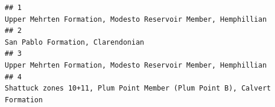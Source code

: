 \documentclass[]{article}
\begin{document}
\begin{verbatim}
## 1                                                                                                                                                                                                                                                                                                                                                                                                                                                                                                                                                                                                                                    Upper Mehrten Formation, Modesto Reservoir Member, Hemphillian
## 2                                                                                                                                                                                                                                                                                                                                                                                                                                                                                                                                                                                                                                                                 San Pablo Formation, Clarendonian
## 3                                                                                                                                                                                                                                                                                                                                                                                                                                                                                                                                                                                                                                    Upper Mehrten Formation, Modesto Reservoir Member, Hemphillian
## 4                                                                                                                                                                                                                                                                                                                                                                                                                                                                                                                                                                                                                         Shattuck zones 10+11, Plum Point Member (Plum Point B), Calvert Formation

\end{verbatim}
\end{document}

